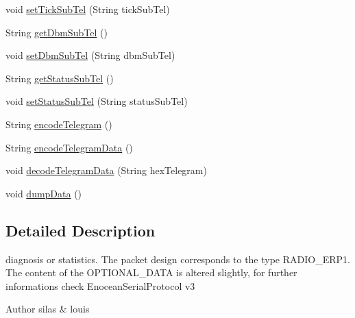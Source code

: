 \begin{DoxyCompactItemize}
\item 
void \hyperlink{classch_1_1bfh_1_1gr33nopo55um_1_1enocean_1_1telegram_1_1_radio_sub_tel_a8e91c89f2d191d545ac526a3f5998909}{set\+Tick\+Sub\+Tel} (String tick\+Sub\+Tel)
\item 
String \hyperlink{classch_1_1bfh_1_1gr33nopo55um_1_1enocean_1_1telegram_1_1_radio_sub_tel_ac3ab4400f9a8c782b4c5480521d543f1}{get\+Dbm\+Sub\+Tel} ()
\item 
void \hyperlink{classch_1_1bfh_1_1gr33nopo55um_1_1enocean_1_1telegram_1_1_radio_sub_tel_a79de15f8b19b17b91252c2455a5ff28d}{set\+Dbm\+Sub\+Tel} (String dbm\+Sub\+Tel)
\item 
String \hyperlink{classch_1_1bfh_1_1gr33nopo55um_1_1enocean_1_1telegram_1_1_radio_sub_tel_ad79232ce0724cd2248c9473729278b65}{get\+Status\+Sub\+Tel} ()
\item 
void \hyperlink{classch_1_1bfh_1_1gr33nopo55um_1_1enocean_1_1telegram_1_1_radio_sub_tel_aa2481b2403118bfbc2068b0be4cf2da0}{set\+Status\+Sub\+Tel} (String status\+Sub\+Tel)
\item 
String \hyperlink{classch_1_1bfh_1_1gr33nopo55um_1_1enocean_1_1telegram_1_1_radio_sub_tel_a6ec56912316c317deb3a350c0c680131}{encode\+Telegram} ()
\item 
String \hyperlink{classch_1_1bfh_1_1gr33nopo55um_1_1enocean_1_1telegram_1_1_radio_sub_tel_a1b05997d0a80627d77c95c2fc8c90e8b}{encode\+Telegram\+Data} ()
\item 
void \hyperlink{classch_1_1bfh_1_1gr33nopo55um_1_1enocean_1_1telegram_1_1_radio_sub_tel_ac639a3f569aba0e79eae9c243e57f7a6}{decode\+Telegram\+Data} (String hex\+Telegram)
\item 
void \hyperlink{classch_1_1bfh_1_1gr33nopo55um_1_1enocean_1_1telegram_1_1_radio_sub_tel_ad6de2cd5f0d51db8fde4be707c911f31}{dump\+Data} ()
\end{DoxyCompactItemize}


\subsection{Detailed Description}
diagnosis or statistics. The packet design corresponds to the type R\+A\+D\+I\+O\+\_\+\+E\+R\+P1. The content of the O\+P\+T\+I\+O\+N\+A\+L\+\_\+\+D\+A\+TA is altered slightly, for further informations check Enocean\+Serial\+Protocol v3

\begin{DoxyAuthor}{Author}
silas \& louis 
\end{DoxyAuthor}


